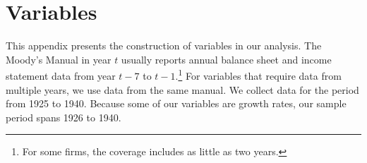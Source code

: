 \clearpage
\appendix 
{}
\setcounter{equation}{0}
\setcounter{table}{0}
\setcounter{figure}{0}
\renewcommand{\theequation}{A.\arabic{equation}} 
\renewcommand{\thesection}{\Alph{section}} 

\section{Variables}
\label{secapp:vars}
\noindent This appendix presents the construction of variables in our analysis. The Moody's Manual in year $t$ usually reports annual balance sheet and income statement data from year $t-7$ to $t-1$.\footnote{For some firms, the coverage includes as little as two years.} For variables that require data from multiple years, we use data from the same manual. We collect data for the period from 1925 to 1940. Because some of our variables are growth rates, our sample period spans 1926 to 1940.
	
